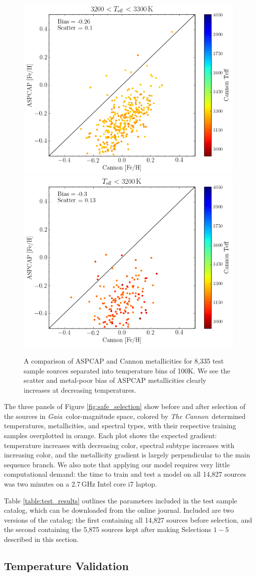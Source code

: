 \documentclass[twocolumn]{aastex62}
\newcommand{\thecannon}{\textsl{The Cannon}}
\newcommand{\gaia}{\textsl{Gaia}}
\begin{document}
\begin{figure}
\begin{center}
	\includegraphics[width=.3\linewidth]{met_comp8.png}
	\includegraphics[width=.3\linewidth]{met_comp9.png} 
	\caption{A comparison of ASPCAP and Cannon metallicities for 8,335 test sample sources separated into temperature bins of 100K. We see the scatter and metal-poor bias of ASPCAP metallicities clearly increases at decreasing temperatures.} 
	\label{fig:met_comp}
\end{center}
\end{figure}


The three panels of Figure \ref{fig:safe_selection} show before and after selection of the sources in \gaia\ color-magnitude space, colored by \thecannon\ determined temperatures, metallicities, and spectral types, with their respective training samples overplotted in orange. Each plot shows the expected gradient: temperature increases with decreasing color, spectral subtype increases with increasing color, and the metallicity gradient is largely perpendicular to the main sequence branch. 
We also note that applying our model requires very little computational demand: the time to train and test a model on all 14,827 sources was two minutes on a 2.7\,GHz Intel core i7 laptop. 

Table \ref{table:test_results} outlines the parameters included in the test sample catalog, which can be downloaded from the online journal. Included are two versions of the catalog: the first containing all 14,827 sources before selection, and the second containing the 5,875 sources kept after making Selections $1-5$ described in this section.

\subsection{Temperature Validation}
\end{document}
